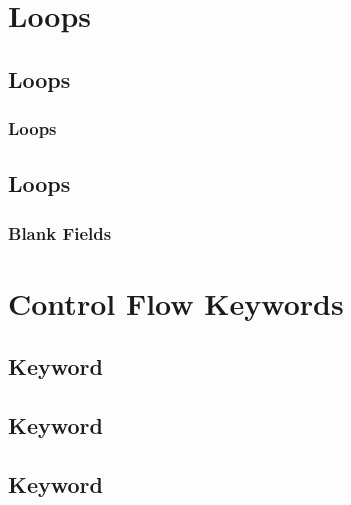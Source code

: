 \documentclass{article}
\begin{document}
\section{Loops}

\subsection{ Loops}

\subsubsection{ Loops}

\subsection{ Loops}

\subsubsection{Blank Fields}

\section{Control Flow Keywords}

\subsection{ Keyword}

\subsection{ Keyword}

\subsection{ Keyword}
\end{document}

